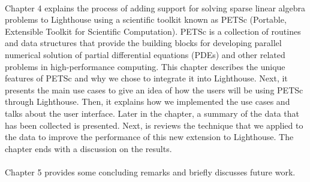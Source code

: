 \paragraph{}
Chapter 4 explains the process of adding support for solving sparse linear algebra problems to Lighthouse using a scientific toolkit known as PETSc (Portable, Extensible Toolkit for Scientific Computation). PETSc is a collection of routines and data structures that provide the building blocks for developing parallel numerical solution of partial differential equations (PDEs) and other related problems in high-performance computing. This chapter describes the unique features of PETSc and why we chose to integrate it into Lighthouse. Next, it presents the main use cases to give an idea of how the users will be using PETSc through Lighthouse. Then, it explains how we implemented the use cases and talks about the user interface. Later in the chapter, a summary of the data that has been collected is presented. Next, is reviews the technique that we applied to the data to improve the performance of this new extension to Lighthouse. The chapter ends with a discussion on the results.

\paragraph{}
Chapter 5 provides some concluding remarks and briefly discusses future work.